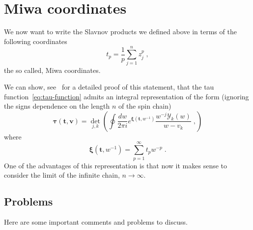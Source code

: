 \documentclass[a4paper,11pt]{amsart}
\begin{document}

\section{Miwa coordinates}

We now want to write the Slavnov products we defined above in terms of the following 
coordinates
\begin{equation}
  t_p = \frac{1}{p}\sum_{j=1}^n z_j^p\; ,
\end{equation}
the so called, Miwa coordinates.

We can show, see~\cite{Araujo:2021ghu} for a detailed proof of this
statement, that the tau function~\ref{eq:tau-function} admits an
integral representation of the form (ignoring the signs dependence on
the length \(n\) of the spin chain)
\begin{equation}
  \label{eq:tau-function-miwa}
  \bm{\tau}(\bm{t}, \bm{v}) = 
    \det_{j,k}\left(
    \oint \frac{d w}{2\pi i} e^{\bm{\xi}(\bm{t}, w^{-1})} \frac{w^{-j}\mathcal{Y}_k(w)}{w - v_k} \; ,
    \right)
\end{equation}
where 
\begin{equation}
  \bm{\xi}(\bm{t}, w^{-1}) = \sum_{p=1}^\infty t_p w^{-p}\; .
\end{equation}
One of the advantages of this representation is that now it makes
sense to consider the limit of the infinite chain, \(n\to \infty\).









\subsection{Problems}
Here are some important comments and problems to discuss. 
\end{document}
